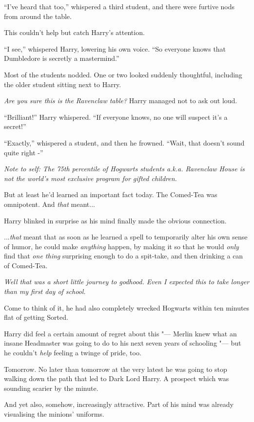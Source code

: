 ``I've heard that too,'' whispered a third student, and there were
furtive nods from around the table.

This couldn't help but catch Harry's attention.

``I see,'' whispered Harry, lowering his own voice. ``So everyone knows
that Dumbledore is secretly a mastermind.''

Most of the students nodded. One or two looked suddenly thoughtful,
including the older student sitting next to Harry.

\emph{Are you sure this is the Ravenclaw table?} Harry managed not to
ask out loud.

``Brilliant!'' Harry whispered. ``If everyone knows, no one will suspect
it's a secret!''

``Exactly,'' whispered a student, and then he frowned. ``Wait, that
doesn't sound quite right -''

\emph{Note to self: The 75th percentile of Hogwarts students a.k.a.
Ravenclaw House is not the world's most exclusive program for gifted
children.}

But at least he'd learned an important fact today. The Comed-Tea was
omnipotent. And \emph{that} meant...

Harry blinked in surprise as his mind finally made the obvious
connection.

...\emph{that} meant that as soon as he learned a spell to
temporarily alter his own sense of humor, he could make \emph{anything}
happen, by making it so that he would \emph{only} find that \emph{one
thing} surprising enough to do a spit-take, and then drinking a can of
Comed-Tea.

\emph{Well that was a short little journey to godhood. Even I expected
this to take longer than my first day of school.}

Come to think of it, he had also completely wrecked Hogwarts within ten
minutes flat of getting Sorted.

Harry did feel a certain amount of regret about this "--- Merlin knew what
an insane Headmaster was going to do to his next seven years of
schooling "--- but he couldn't \emph{help} feeling a twinge of pride, too.

Tomorrow. No later than tomorrow at the very latest he was going to stop
walking down the path that led to Dark Lord Harry. A prospect which was
sounding scarier by the minute.

And yet also, somehow, increasingly attractive. Part of his mind was
already visualising the minions' uniforms.

